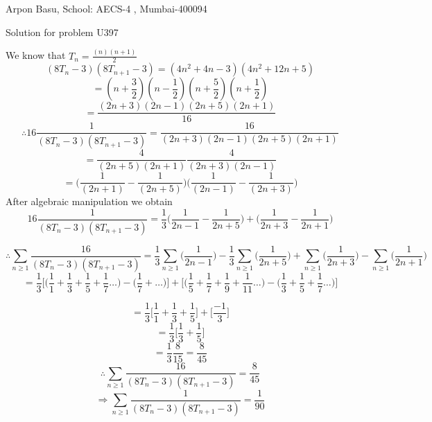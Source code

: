 \documentclass[10pt,a4paper]{extarticle}
\begin{document}
\begin{center}


Arpon Basu, School: AECS-4 , Mumbai-400094

Solution for problem U397
\end{center}

We know that $T_{n}=\frac{(n)(n+1)}{2}$
$$(8T_{n}-3)(8T_{n+1}-3) = (4n^2+4n-3)(4n^2+12n+5) $$ 
$$=(n+\frac{3}{2})(n-\frac{1}{2})(n+\frac{5}{2})(n+\frac{1}{2}) $$ 
$$=\frac{(2n+3)(2n-1)(2n+5)(2n+1)}{16} $$
$$\therefore 16 \frac{1}{(8T_{n}-3)(8T_{n+1}-3)} = \frac{16}{(2n+3)(2n-1)(2n+5)(2n+1)} $$
$$= \frac{4}{(2n+5)(2n+1)} \frac{4}{(2n+3)(2n-1)}   $$
$$= \Big(\frac{1}{(2n+1)}-\frac{1}{(2n+5)}\Big) \Big(\frac{1}{(2n-1)}-\frac{1}{(2n+3)}\Big)   $$
After algebraic manipulation we obtain 
$$16 \frac{1}{(8T_{n}-3)(8T_{n+1}-3)} = \frac{1}{3}\Big(\frac{1}{2n-1}-\frac{1}{2n+5}\Big) + \Big(\frac{1}{2n+3}-\frac{1}{2n+1}\Big) $$

$$\therefore \sum_{n \ge 1} \frac{16}{(8T_{n}-3)(8T_{n+1}-3)} = \frac{1}{3} \sum_{n \ge 1} \Big(\frac{1}{2n-1} \Big) 
                                                               - \frac{1}{3} \sum_{n \ge 1} \Big(\frac{1}{2n+5} \Big)
                                                                + \sum_{n \ge 1} \Big(\frac{1}{2n+3} \Big)
                                                                 - \sum_{n \ge 1} \Big(\frac{1}{2n+1} \Big)$$
$$=\frac{1}{3}\big[\big(\frac{1}{1}+\frac{1}{3}+\frac{1}{5} +\frac{1}{7} \dots \big)- \big(\frac{1}{7}+ \dots \big)\big] 
   + \big[\big(\frac{1}{5}+\frac{1}{7}+\frac{1}{9} +\frac{1}{11} \dots \big)- \big(\frac{1}{3}+ \frac{1}{5} + \frac{1}{7} \dots \big)\big]$$

$$ = \frac{1}{3}\big[\frac{1}{1}+\frac{1}{3}+\frac{1}{5}\big] +  \big[\frac{-1}{3}\big]$$
$$ = \frac{1}{3}\big[\frac{1}{3}+\frac{1}{5}\big] $$
$$=\frac{1}{3} \frac{8}{15} = \frac{8}{45} $$
$$\therefore \sum_{n \ge 1} \frac{16}{(8T_{n}-3)(8T_{n+1}-3)} = \frac{8}{45} $$ 
$$ \Rightarrow \sum_{n \ge 1} \frac{1}{(8T_{n}-3)(8T_{n+1}-3)} = \frac{1}{90} $$
\end{document}
